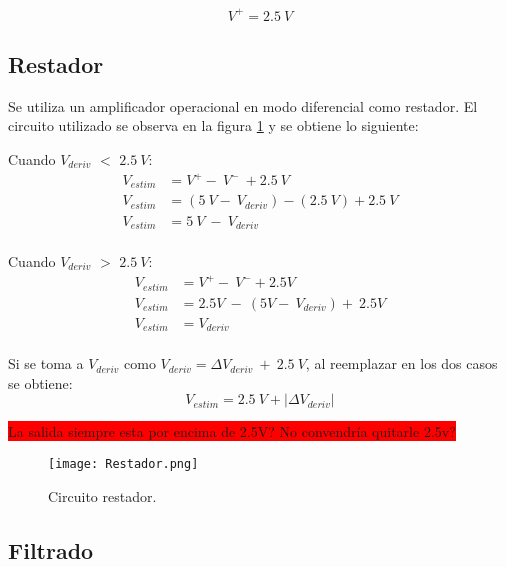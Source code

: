 \begin{equation} 
	V^+ = 2.5\:V
\end{equation}


\subsection{Restador}

Se utiliza un amplificador operacional en modo diferencial como restador. El circuito utilizado se observa en la figura \ref{fig:img_Restador} y se obtiene lo siguiente:

Cuando $V_{deriv}$ $\mathrm{<}$ $2.5\:V$:
\begin{equation*} 
	\begin{aligned}
		V_{estim}&=V^+-\ V^-\ +2.5\:V\\ 
		V_{estim}&=(5\:V -\ V_{deriv})-(2.5\: V)+2.5\:V\\
		V_{estim}&=5\: V\ -\ V_{deriv}\\ 
	\end{aligned}
\end{equation*}


Cuando $V_{deriv}$ $\mathrm{>}$ $2.5\:V$: 
\begin{equation*} 
	\begin{aligned}
		V_{estim}&=V^+-\ V^-+2.5V\\ 
		V_{estim}&=2.5V\ -\ (5V-\ V_{deriv})+\ 2.5V\\
		V_{estim}&=V_{deriv}\\
	\end{aligned}
\end{equation*}

Si se toma a $V_{deriv}$ como $V_{deriv}=\mathit{\Delta}V_{deriv}\ +\ 2.5\: V$, al reemplazar en los dos casos se obtiene:
\begin{equation} \label{eq_rest_3}
	V_{estim}= 2.5\:V + |\mathit{\Delta}V_{deriv}|
\end{equation}

\colorbox{red}{La salida siempre esta por encima de 2.5V? No convendría quitarle 2.5v?}

\begin{figure}[H]
	\centering
	\texttt{[image: Restador.png]}
	\caption{Circuito restador.}
	\label{fig:img_Restador}
\end{figure}

\subsection{Filtrado}

